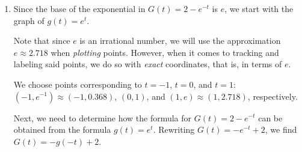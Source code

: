 \documentclass{ximera}
\begin{document}
\begin{example}
\begin{explanation}
\begin{enumerate}
\begin{enumerate}
Looking point by point, we have $(-1,3) \rightarrow (0, 3) \rightarrow (0,6)$, $(0,1) \rightarrow (1,1) \rightarrow (1,2)$, and $\left( 1, \frac{1}{3} \right) \rightarrow \left( 2,  \frac{1}{3} \right) \rightarrow  \left( 2,  \frac{2}{3} \right)$.  The horizontal asymptote, $y = 0$ remains unchanged under the horizontal shift and the vertical stretch since $2 \cdot 0 = 0$.   


The GeoGebra interactive below helps us visualize each of these transformation steps starting with the graph of $f(x) = \left(\frac{1}{3}\right)^{x}$. When we select each step, GeoGebra not only tracks our three control points through the transformation, it also displays the resulting graph. 


\begin{center}
\end{center}

As always we can check our answer by verifying each of the points $(0,6)$, $(1,2)$, $\left( 2, \frac{2}{3} \right)$ is on the graph of $F(x) = 2 \left(\frac{1}{3}\right)^{x-1}$ by checking $F(0) = 6$, $F(1) = 2$, and $F(2) = \frac{2}{3}$.  

 

We can check the end behavior as well, that is, $\lim_{x \rightarrow -\infty} F(x) = \infty$ and  $\lim_{x \rightarrow \infty} F(x) = 0$ .  We leave these calculations to the reader.


\item  Since the  base of the exponential in $G(t) =2 - e^{-t}$  is $e$, we start with the graph of $g(t) = e^{t}$.  

 

 Note that since $e$ is an irrational number, we will use the approximation $e \approx 2.718$ when \textit{plotting} points.  However, when it comes to tracking and labeling said points, we do so with  \textit{exact} coordinates, that is,  in terms of $e$.

 

We choose points corresponding to $t = -1$, $t = 0$, and $t = 1$:  $(-1, e^{-1}) \approx (-1, 0.368)$, $(0,1)$, and $(1, e) \approx (1, 2.718)$, respectively.  

 

Next, we need to determine how the formula for $G(t) = 2-e^{-t}$ can be obtained from the formula $g(t) = e^{t}$. Rewriting $G(t) = -e^{-t} + 2$, we find $G(t) = -g(-t) + 2$.


\end{enumerate}
\end{enumerate}
\end{explanation}
\end{example}
\end{document}
